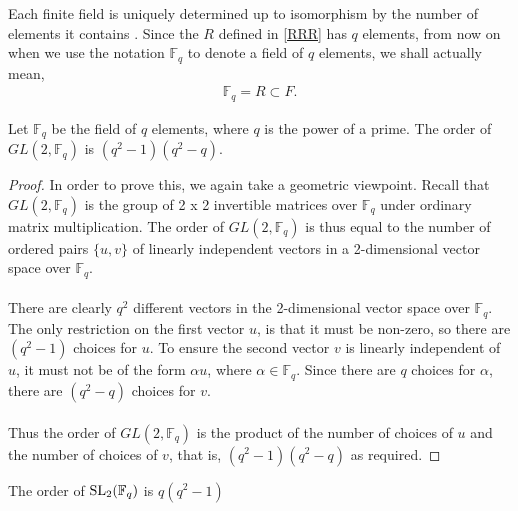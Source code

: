 Each finite field is uniquely determined up to isomorphism by the number of elements it contains \cite[p.227]{stewart}. Since the $R$ defined in \eqref{RRR} has $q$ elements, from now on when we use the notation $\mathbb{F}_q$ to denote a field of $q$ elements, we shall actually mean,
\begin{align}
    \label{subfield} \mathbb{F}_q = R \subset F.
\end{align}

\begin{lemma}
    \label{Matrix.card_GL_field}
    \leanok
    Let $\mathbb{F}_q$ be the field of $q$ elements, where $q$ is the power of a prime. The order of $GL(2,\mathbb{F}_q)$ is $(q^2-1)(q^2-q)$.
\end{lemma}
\begin{proof}
    In order to prove this, we again take a geometric viewpoint. Recall that $GL(2,\mathbb{F}_q)$ is the group of 2 x 2 invertible matrices over $\mathbb{F}_q$ under ordinary matrix multiplication. The order of $GL(2,\mathbb{F}_q)$ is thus equal to the number of ordered pairs $\{u,v\}$ of linearly independent vectors in a 2-dimensional vector space over $\mathbb{F}_q$. \\
    \\
    There are clearly $q^2$ different vectors in the 2-dimensional vector space over $\mathbb{F}_q$. The only restriction on the first vector $u$, is that it must be non-zero, so there are $(q^2 - 1)$ choices for $u$. To ensure the second vector $v$ is linearly independent of $u$, it must not be of the form $\alpha u$, where $\alpha \in \mathbb{F}_q$. Since there are $q$ choices for $\alpha$, there are $(q^2-q)$ choices for $v$. \\
    \\
    Thus the order of $GL(2,\mathbb{F}_q)$ is the product of the number of choices of $u$ and the number of choices of $v$, that is, $(q^2-1)(q^2-q)$ as required.
\end{proof}

\begin{lemma}
\label{card_SL_field}

The order of $\operatorname{SL}_2(\mathbb{F}_q)$ is $q(q^2-1)$
\end{lemma}

